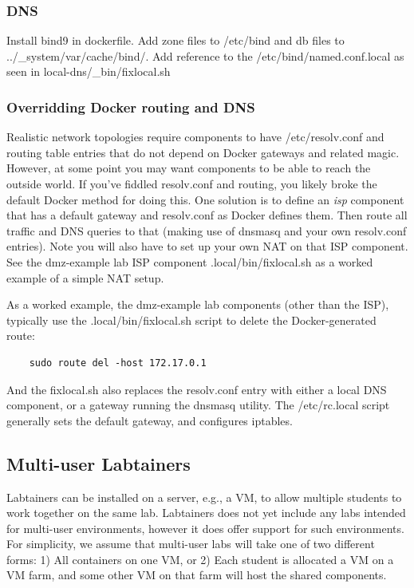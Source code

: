\documentclass[12pt]{article}
\begin{document}
\subsubsection{DNS}
Install bind9 in dockerfile.  Add zone files to /etc/bind and db files to ../\_system/var/cache/bind/.
Add reference to the /etc/bind/named.conf.local as seen in local-dns/\_bin/fixlocal.sh

\subsubsection{Overridding Docker routing and DNS}
Realistic network topologies require components to have /etc/resolv.conf and routing
table entries that do not depend on Docker gateways and related magic.  However, at some point you may
want components to be able to reach the outside world.  If you've fiddled resolv.conf and routing,
you likely broke the default Docker method for doing this.  One solution is to 
define an \textit{isp} component that has a default gateway and resolv.conf as Docker defines them.  Then
route all traffic and DNS queries to that (making use of dnsmasq and your own resolv.conf entries).  
Note you will also have to set up your own NAT on that ISP component.  See the dmz-example lab
ISP component .local/bin/fixlocal.sh as a worked example of a simple NAT setup.

As a worked example, the dmz-example lab components (other than the ISP), typically use the .local/bin/fixlocal.sh script to 
delete the Docker-generated route:
\begin{verbatim}
    sudo route del -host 172.17.0.1
\end{verbatim}
\noindent And the fixlocal.sh also replaces the resolv.conf entry with either a local DNS component, or a gateway running
the dnsmasq utility.  The /etc/rc.local script generally sets the default gateway, and configures iptables.

\subsection {Multi-user Labtainers}
Labtainers can be installed on a server, e.g., a VM, to allow multiple students to work together on the
same lab.  Labtainers does not yet include any labs intended for multi-user environments, however it does
offer support for such environments.  For simplicity, we assume that multi-user labs will take one of two
different forms:  1) All containers on one VM, or 2) Each student is allocated a VM on a VM farm, and some other
VM on that farm will host the shared components.
\end{document}
